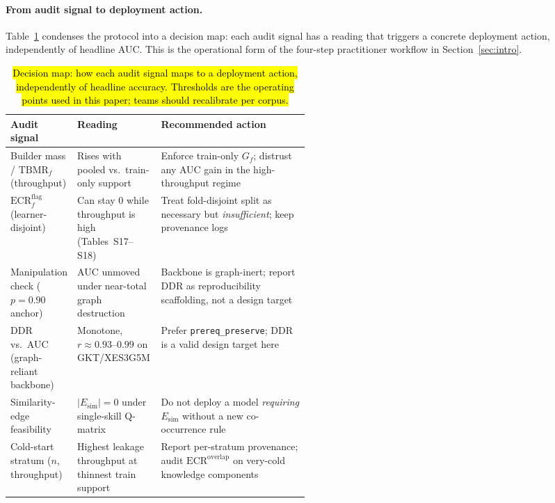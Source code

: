 \documentclass[pdflatex,sn-mathphys-num]{sn-jnl}
\newcommand{\Esim}{\ensuremath{E_{\text{sim}}}}
\newcommand{\KCs}{knowledge components}
\newcommand{\DDR}{\textsc{DDR}}
\newcommand{\rev}[1]{\hl{#1}}
\newcommand{\rev}[1]{#1}
\newenvironment{revbox}{}{}
\begin{document}
\begin{revbox}
\paragraph{From audit signal to deployment action.}
Table~\ref{tab:audit-actions} condenses the protocol into a decision map: each
audit signal has a reading that triggers a concrete deployment action,
independently of headline AUC. This is the operational form of the four-step
practitioner workflow in Section~\ref{sec:intro}.
\end{revbox}

\begin{table}[t]
\centering
\caption{\rev{Decision map: how each audit signal maps to a deployment action,
independently of headline accuracy. Thresholds are the operating points used in
this paper; teams should recalibrate per corpus.}}
\label{tab:audit-actions}
\footnotesize
\setlength{\tabcolsep}{4pt}
\begin{tabularx}{\linewidth}{@{} >{\RaggedRight\arraybackslash}p{0.22\linewidth}
  >{\RaggedRight\arraybackslash}p{0.28\linewidth}
  >{\RaggedRight\arraybackslash}X @{}}
\toprule
Audit signal & Reading & Recommended action \\
\midrule
Builder mass / $\mathrm{TBMR}_f$ (throughput) & Rises with pooled vs.\ train-only
support & Enforce train-only $G_f$; distrust any AUC gain in the high-throughput
regime \\
$\mathrm{ECR}^{\mathrm{flag}}_f$ (learner-disjoint) & Can stay $0$ while
throughput is high (Tables~S17--S18) & Treat fold-disjoint split as necessary but
\emph{insufficient}; keep provenance logs \\
Manipulation check ($p{=}0.90$ anchor) & AUC unmoved under near-total graph
destruction & Backbone is graph-inert; report \DDR{} as reproducibility scaffolding,
not a design target \\
\DDR{} vs.\ AUC (graph-reliant backbone) & Monotone, $r{\approx}0.93$--$0.99$ on GKT/XES3G5M
& Prefer \texttt{prereq\_preserve}; \DDR{} is a valid design target here \\
Similarity-edge feasibility & $|E_{\mathrm{sim}}|{=}0$ under single-skill Q-matrix
& Do not deploy a model \emph{requiring} $\Esim$ without a new co-occurrence rule \\
Cold-start stratum ($n$, throughput) & Highest leakage throughput at thinnest
train support & Report per-stratum provenance; audit $\mathrm{ECR}^{\mathrm{overlap}}$
on very-cold \KCs{} \\
\bottomrule
\end{tabularx}
\end{table}
\end{document}
